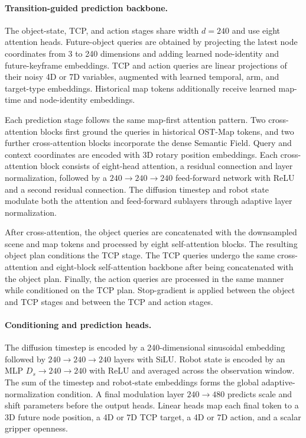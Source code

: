 \paragraph{Transition-guided prediction backbone.}
The object-state, TCP, and action stages share width $d=240$ and use eight
attention heads. Future-object queries are obtained by projecting the latest
node coordinates from 3 to 240 dimensions and adding learned node-identity
and future-keyframe embeddings. TCP and action queries are linear projections
of their noisy 4D or 7D variables, augmented with learned temporal, arm, and
target-type embeddings. Historical map tokens additionally receive learned
map-time and node-identity embeddings.

Each prediction stage follows the same map-first attention pattern. Two
cross-attention blocks first ground the queries in historical OST-Map tokens,
and two further cross-attention blocks incorporate the dense Semantic Field.
Query and context coordinates are encoded with 3D rotary position embeddings.
Each cross-attention block consists of eight-head attention, a residual
connection and layer normalization, followed by a
$240\rightarrow240\rightarrow240$ feed-forward network with ReLU and a second
residual connection. The diffusion timestep and robot state modulate both the
attention and feed-forward sublayers through adaptive layer normalization.

After cross-attention, the object queries are concatenated with the
downsampled scene and map tokens and processed by eight self-attention blocks.
The resulting object plan conditions the TCP stage. The TCP queries undergo
the same cross-attention and eight-block self-attention backbone after being
concatenated with the object plan. Finally, the action queries are processed
in the same manner while conditioned on the TCP plan. Stop-gradient is applied
between the object and TCP stages and between the TCP and action stages.

\paragraph{Conditioning and prediction heads.}
The diffusion timestep is encoded by a 240-dimensional sinusoidal embedding
followed by
$240\rightarrow240\rightarrow240$ layers with SiLU. Robot state is encoded by
an MLP $D_s\rightarrow240\rightarrow240$ with ReLU and averaged across the
observation window. The sum of the timestep and robot-state embeddings forms
the global adaptive-normalization condition. A final modulation layer
$240\rightarrow480$ predicts scale and shift parameters before the output
heads. Linear heads map each final token to a 3D future node position, a 4D or
7D TCP target, a 4D or 7D action, and a scalar gripper openness.

